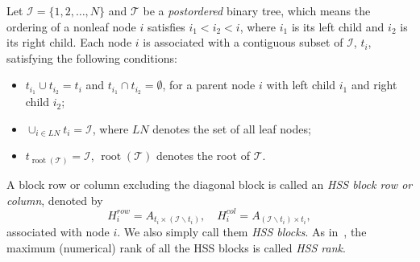 \documentclass[times]{nlaauth}
\begin{document}
Let $\mathcal{I}=\{1,2,\ldots, N\}$ and
$\mathcal{T}$ be a \emph{postordered} binary tree, which means the ordering of a nonleaf node $i$
satisfies $i_1 < i_2 <i$, where $i_1$ is its left child and $i_2$ is its right child.
Each node $i$ is associated with a contiguous subset of $\mathcal{I}$, $t_i$, satisfying the
following conditions:
\begin{itemize}
\item $t_{i_1}\cup t_{i_2}=t_i$ and $t_{i_1}\cap t_{i_2}=\emptyset$, for a parent node $i$ with
  left child $i_1$ and right child $i_2$;

  \item $\cup_{i \in LN} t_i = \mathcal{I}$, where $LN$ denotes the set of all leaf nodes;

\item $t_{\operatorname*{root}(\mathcal{T})}=\mathcal{I}$,
  $\operatorname*{root}(\mathcal{T})$ denotes the root of $\mathcal{T}$.
\end{itemize}
A block row or column excluding the diagonal block is called an \emph{HSS block row or column},
denoted by
\[
H_i^{row} = A_{t_i \times (\mathcal{I}\backslash t_i)}, \quad H_i^{col} = A_{(\mathcal{I}\backslash t_i)\times t_i},
\]
associated with node $i$. We also simply call them \emph{HSS blocks}.
As in~\cite{Xia-HSS-Chol}, the maximum (numerical) rank of all the HSS blocks is
called \emph{HSS rank}.
\end{document}
